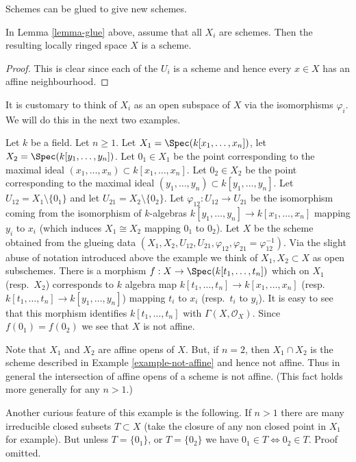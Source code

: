 \begin{lemma}
\label{lemma-glue-schemes}
\begin{reference}
\cite[Chapter II, \S 1, no. 34, Proposition 8, p. 227]{FAC}
\end{reference}
\begin{slogan}
Schemes can be glued to give new schemes.
\end{slogan}
In Lemma \ref{lemma-glue} above, assume that all
$X_i$ are schemes. Then the resulting locally ringed
space $X$ is a scheme.
\end{lemma}

\begin{proof}
This is clear since each of the $U_i$ is a scheme
and hence every $x \in X$ has an affine neighbourhood.
\end{proof}

\noindent
It is customary to think of $X_i$ as an open subspace of
$X$ via the isomorphisms $\varphi_i$. We will do this in
the next two examples.

\begin{example}
\label{example-affine-space-zero-doubled}
Let $k$ be a field. Let $n \geq 1$.
Let $X_1 = \Spec(k[x_1, \ldots, x_n])$,
let $X_2 = \Spec(k[y_1, \ldots, y_n])$.
Let $0_1 \in X_1$ be the point corresponding to the maximal ideal
$(x_1, \ldots, x_n) \subset k[x_1, \ldots, x_n]$.
Let $0_2 \in X_2$ be the point corresponding to the maximal ideal
$(y_1, \ldots, y_n) \subset k[y_1, \ldots, y_n]$.
Let $U_{12} = X_1 \setminus \{0_1\}$ and
let $U_{21} = X_2 \setminus \{0_2\}$. Let
$\varphi_{12} : U_{12} \to U_{21}$ be the isomorphism
coming from the isomorphism of $k$-algebras
$k[y_1, \ldots, y_n] \to k[x_1, \ldots, x_n]$
mapping $y_i$ to $x_i$ (which induces $X_1 \cong X_2$ mapping
$0_1$ to $0_2$).
Let $X$ be the scheme obtained from the glueing data
$(X_1, X_2, U_{12}, U_{21}, \varphi_{12},
\varphi_{21} = \varphi_{12}^{-1})$. Via the slight abuse
of notation introduced above the example we think of
$X_1, X_2 \subset X$ as open subschemes.
There is a morphism $f : X \to \Spec(k[t_1, \ldots, t_n])$
which on $X_1$ (resp.\ $X_2$) corresponds to $k$ algebra map
$k[t_1, \ldots, t_n] \to k[x_1, \ldots, x_n]$
(resp.\ $k[t_1, \ldots, t_n] \to k[y_1, \ldots, y_n]$)
mapping $t_i$ to $x_i$ (resp.\  $t_i$ to $y_i$).
It is easy to see that this morphism identifies
$k[t_1, \ldots, t_n]$ with $\Gamma(X, \mathcal{O}_X)$. Since
$f(0_1) = f(0_2)$ we see that $X$ is not affine.

\medskip\noindent
Note that $X_1$ and $X_2$ are affine opens of $X$.
But, if $n = 2$, then $X_1 \cap X_2$ is the scheme
described in Example \ref{example-not-affine} and hence not affine.
Thus in general the intersection of affine opens of a scheme
is not affine. (This fact holds more generally for any $n > 1$.)

\medskip\noindent
Another curious feature of this example is the following.
If $n > 1$ there are many irreducible closed subsets $T \subset X$
(take the closure of any non closed point in $X_1$ for example).
But unless $T = \{0_1\}$, or $T = \{0_2\}$ we have
$0_1 \in T \Leftrightarrow 0_2 \in T$. Proof omitted.
\end{example}

